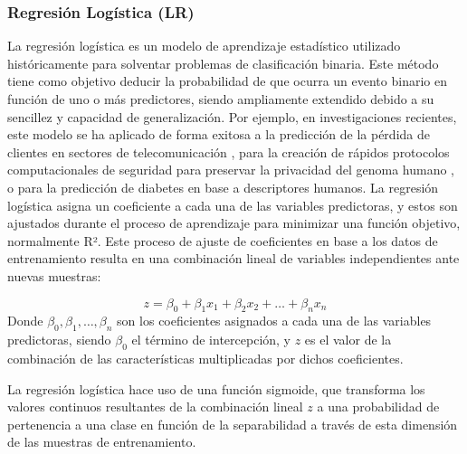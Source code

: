 






\subsubsection*{Regresión Logística (LR)}



La regresión logística es un modelo de aprendizaje estadístico utilizado históricamente para solventar problemas de clasificación binaria. Este método tiene como objetivo deducir la probabilidad de que ocurra un evento binario en función de uno o más predictores, siendo ampliamente extendido debido a su sencillez y capacidad de generalización. Por ejemplo, en investigaciones recientes, este modelo se ha aplicado de forma exitosa a la predicción de la pérdida de clientes en sectores de telecomunicación \cite{jain2020churn}, para la creación de rápidos protocolos computacionales de seguridad para preservar la privacidad del genoma humano \cite{de2021high}, o para la predicción de diabetes \cite{joshi2021predicting} en base a descriptores humanos. La regresión logística asigna un coeficiente a cada una de las variables predictoras, y estos son ajustados durante el proceso de aprendizaje para minimizar una función objetivo, normalmente R². Este proceso de ajuste de coeficientes en base a los datos de entrenamiento resulta en una combinación lineal de variables independientes ante nuevas muestras:

\[
z = \beta_0 + \beta_1 x_1 + \beta_2 x_2 + \dots + \beta_n x_n
\]
Donde $\beta_0, \beta_1, \dots, \beta_n$ son los coeficientes asignados a cada una de las variables predictoras, siendo $\beta_0$ el término de intercepción, y $z$ es el valor de la combinación de las características multiplicadas por dichos coeficientes.

La regresión logística hace uso de una función sigmoide, que transforma los valores continuos resultantes de la combinación lineal $z$ a una probabilidad de pertenencia a una clase en función de la separabilidad a través de esta dimensión de las muestras de entrenamiento.

